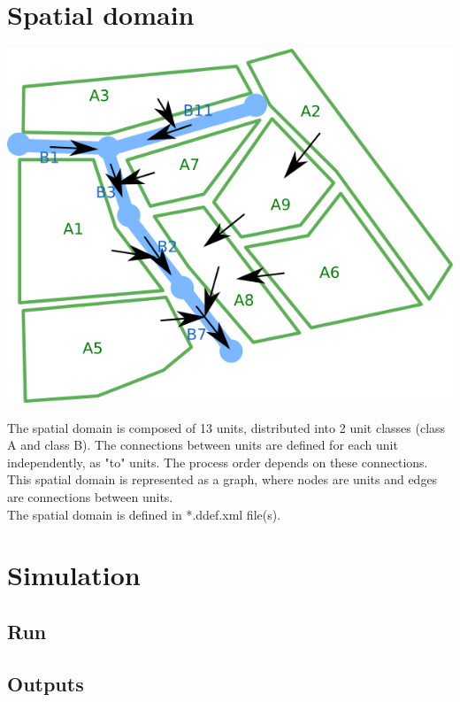 \documentclass[a4paper,11pt]{article}
\begin{document}
\bigskip
\bigskip

\section{Spatial domain}

\begin{floatingfigure}[left]{8cm}
\includegraphics[scale=0.6]{openfluid-engine_example-primitives_en/domain.png}
\end{floatingfigure}
The spatial domain is composed of 13 units, distributed into 2 unit classes 
(class A and class B). The connections between 
units are defined for each unit independently, as "to" units. The process order 
depends on these connections. This spatial domain is represented as a graph, 
where nodes are units and edges are connections between units.\\
\noindent The spatial domain is defined in *.ddef.xml file(s). 

\bigskip
\bigskip

\section{Simulation}

\subsection{Run}

\subsection{Outputs}
\end{document}
